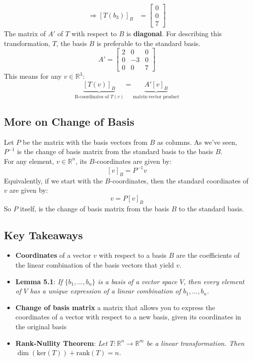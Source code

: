 \documentclass[a4paper, 9pt]{extarticle}
\begin{document}
\begin{examplebox}{}{}
$$\begin{aligned}
      \Longrightarrow [T(b_{3})]_B & = \begin{bmatrix} 0 \\ 0 \\ 7 \end{bmatrix}
    \end{aligned}
  $$
  The matrix of $A'$ of $T$ with respect to $B$ is \textbf{diagonal}. For describing this transformation, $T$, the basis $B$ is preferable to the standard basis.
  $$
    A ' =
    \begin{bmatrix}
      2 & 0  & 0 \\
      0 & -3 & 0 \\
      0 & 0  & 7
    \end{bmatrix}
  $$
  This means for any $v \in \mathbb{R}^3$:
  $$
    \underbrace{[T(v)]_B}_{\text{B-coordinates of } T(v)} = \underbrace{A'[v]_B}_{\text{matrix-vector product}}
  $$
\end{examplebox}
\subsection{More on Change of Basis}
Let $P$ be the matrix with the basis vectors from $B$ as columns. As we've seen, $P^{-1}$ is the change of basis matrix from  the standard basis to the basis $B$. \\[2ex]
For any element, $v \in \mathbb{R}^n$, its $B$-coordinates are given by:
$$
  [v]_B = P^{-1}v
$$
Equivalently, if we start with the $B$-coordinates, then the standard coordinates of $v$ are given by:
$$
  v = P[v]_B
$$
So $P$ itself, is the change of basis matrix from the basis $B$ to the standard basis.
\subsection{Key Takeaways}
\begin{takeaway-box}{}{}
\begin{itemize}
  \item \textbf{Coordinates} of a vector $v$ with respect to a basis $B$ are the coefficients of the linear combination of the basis vectors that yield $v$.
  \item \textbf{Lemma 5.1}: \textit{If $\{b_1, \dots, b_n\}$ is a basis of a vector space $V$, then every element of $V$ has a unique expression of a linear combination of $b_1, \dots, b_n$.}
  \item \textbf{Change of basis matrix} a matrix that allows you to express the coordinates of a vector with respect to a new basis, given its coordinates in the original basis
  \item \textbf{Rank-Nullity Theorem}: \textit{Let $T: \mathbb{R}^n \to \mathbb{R}^m$ be a linear transformation. Then $\dim(\text{ker}(T)) + \text{rank}(T) = n$.}
\end{itemize}
\end{takeaway-box}
\end{document}

